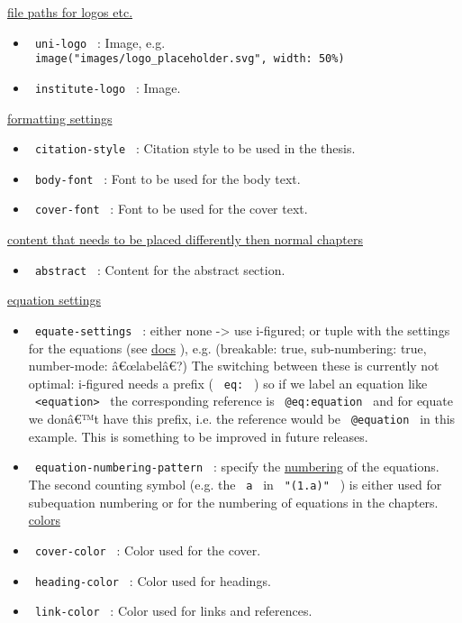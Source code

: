 \ul{file paths for logos etc.}

\begin{itemize}
\tightlist
\item
  \texttt{\ uni-logo\ } : Image, e.g.
  \texttt{\ image("images/logo\_placeholder.svg",\ width:\ 50\%)\ }
\item
  \texttt{\ institute-logo\ } : Image.
\end{itemize}

\ul{formatting settings}

\begin{itemize}
\tightlist
\item
  \texttt{\ citation-style\ } : Citation style to be used in the thesis.
\item
  \texttt{\ body-font\ } : Font to be used for the body text.
\item
  \texttt{\ cover-font\ } : Font to be used for the cover text.
\end{itemize}

\ul{content that needs to be placed differently then normal chapters}

\begin{itemize}
\tightlist
\item
  \texttt{\ abstract\ } : Content for the abstract section.
\end{itemize}

\ul{equation settings}

\begin{itemize}
\tightlist
\item
  \texttt{\ equate-settings\ } : either none -\textgreater{} use
  i-figured; or tuple with the settings for the equations (see
  \href{https://typst.app/universe/package/equate}{docs} ), e.g.
  (breakable: true, sub-numbering: true, number-mode: â€œlabelâ€?) The
  switching between these is currently not optimal: i-figured needs a
  prefix ( \texttt{\ eq:\ } ) so if we label an equation like
  \texttt{\ \textless{}equation\textgreater{}\ } the corresponding
  reference is \texttt{\ @eq:equation\ } and for equate we donâ€™t have
  this prefix, i.e. the reference would be \texttt{\ @equation\ } in
  this example. This is something to be improved in future releases.
\item
  \texttt{\ equation-numbering-pattern\ } : specify the
  \href{https://typst.app/docs/reference/model/numbering/\#parameters-numbering}{numbering}
  of the equations. The second counting symbol (e.g. the \texttt{\ a\ }
  in \texttt{\ "(1.a)"\ } ) is either used for subequation numbering or
  for the numbering of equations in the chapters. \ul{colors}
\item
  \texttt{\ cover-color\ } : Color used for the cover.
\item
  \texttt{\ heading-color\ } : Color used for headings.
\item
  \texttt{\ link-color\ } : Color used for links and references.
\end{itemize}

